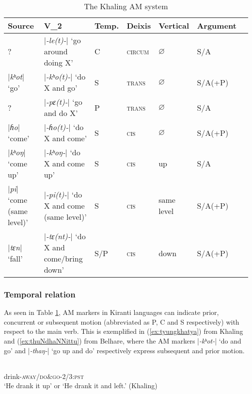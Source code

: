 \documentclass[oneside,a4paper,11pt]{article}
\newcommand{\ipa}[1]{{\phon\textit{#1}}}
\newcommand{\rouge}[1]{{\color{red}#1}}
\newcommand{\dhatu}[2]{|\ipa{#1}| `#2'}
\begin{document}
\begin{landscape}
\begin{table}%
\caption{The Khaling AM system} \label{tab:system} \centering
\begin{tabular}{lllllll}
\toprule
Source &V_2 & Temp.& Deixis & Vertical  & Argument \\
\midrule
?& \dhatu{-le(t)-}{go around doing X} &C& \textsc{circum} & $\varnothing$ & S/A \\
\dhatu{kʰot}{go} &\dhatu{-kʰo(t)-}{do X and go} &S& \textsc{trans} & $\varnothing$ &  S/A(+P) \\
?&\dhatu{-pɛ(t)-}{go and do X} &P& \textsc{trans} & $\varnothing$ & S/A \\
\dhatu{ɦo}{come} &\dhatu{-ɦo(t)-}{do X and come} &S& \textsc{cis} & $\varnothing$ & S/A(+P) \\
\dhatu{kʰoŋ}{come up}&\dhatu{-kʰoŋ-}{do X and come up} &S& \textsc{cis} &up & S/A \\
 \dhatu{pi}{come (same level)}&\dhatu{-pi(t)-}{do X and come (same level)} &S& \textsc{cis} &same level & S/A(+P) \\
\dhatu{tɛn}{fall} & \dhatu{-tɛ(nt)-}{do X and come/bring down} &S/P & \textsc{cis} &down & S/A(+P) \\
\bottomrule
\end{tabular}
\end{table}
\end{landscape}

 \subsubsection{Temporal relation} \label{sec:temporal.khaling}
As seen in Table \ref{tab:system}, AM markers in Kiranti languages can indicate prior, concurrent or subsequent motion (abbreviated as P, C and S respectively) with respect to the main verb.  This is exemplified in (\ref{ex:tyungkhatya}) from Khaling and (\ref{ex:thuNdhaNNittu}) from Belhare, where the AM markers \dhatu{-kʰot-}{do and go} and  \dhatu{-thaŋ-}{go up and do} respectively express subsequent and prior motion.

\begin{exe}
\ex \label{ex:tyungkhatya}
 \gll   \ipa{tʉ̂ŋ-\rouge{kʰʌ}-tɛ} \\
 drink-\textsc{away/\rouge{do\&go}}-\textsc{2/3:pst} \\
 \glt `He drank it up' or `He drank it and left.'  (Khaling)
 \end{exe}
 
\end{document}
